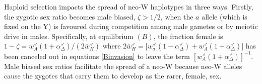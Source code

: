 \documentclass[12pt]{article}
\begin{document}

Haploid selection impacts the spread of neo-W haplotypes in three ways.
Firstly, the zygotic sex ratio becomes male biased, $\zeta>1/2$, when the $a$ allele (which is fixed on the Y) is favoured during competition among male gametes or by meiotic drive in males.
Specifically, at equilibrium $(B)$, the fraction female is $1 - \zeta = w_A^\male (1+\alpha^\male_\Delta) / (2\bar{w}_{H}^\male)$ where $2\bar{w}_{H}^\male= \big[w_a^\male (1-\alpha^\male_\Delta) +  w_A^\male (1+\alpha^\male_\Delta) \big]$ has been canceled out in equations \eqref{Binvasion} to leave the term $\left[w_{A}^\male (1+\alpha^\male_\Delta) \right]^{-1}$. 
Male biased sex ratios facilitate the spread of a neo-W because neo-W alleles cause the zygotes that carry them to develop as the rarer, female, sex. 
\end{document}
